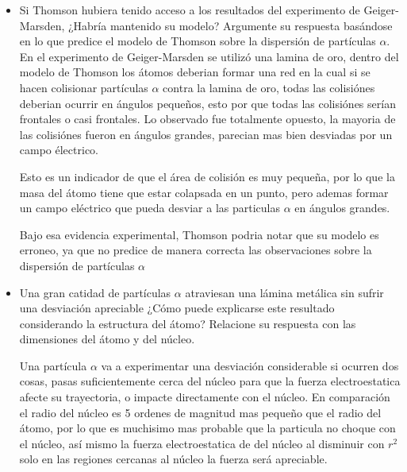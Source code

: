 \documentclass[12pt,a4paper]{article}
\begin{document}
\begin{itemize}
Su deducción fue que las particulas de las cuales estan echos los rayos catodicos son fundamentales en la compocición de la materia, y tienen mucha menos masa que los iones, por lo que tienen que formar parte de los átomos, pero el echo de que los atomos sean neutros y esta nueva particula que los compone tenga carga negativa, implica que el átomo esta formado de una carga positiva que neutralice la carga negativa.\\

\item Si Thomson hubiera tenido acceso a los resultados del experimento de Geiger-Marsden, ¿Habría mantenido su modelo? Argumente su respuesta basándose en lo que predice el modelo de Thomson sobre la dispersión de partículas $\alpha$.\\

En el experimento de Geiger-Marsden se utilizó una lamina de oro, dentro del modelo de Thomson los átomos deberian formar una red en la cual si se hacen colisionar partículas $\alpha$ contra la lamina de oro, todas las colisiónes deberian ocurrir en ángulos pequeños, esto por que todas las colisiónes serían frontales o casi frontales. Lo observado fue totalmente opuesto, la mayoria de las colisiónes fueron en ángulos grandes, parecian mas bien desviadas por un campo électrico.

Esto es un indicador de que el área de colisión es muy pequeña, por lo que la masa del átomo tiene que estar colapsada en un punto, pero ademas formar un campo eléctrico que pueda desviar a las particulas $\alpha$ en ángulos grandes. 


Bajo esa evidencia experimental, Thomson podria notar que su modelo es erroneo, ya que no predice de manera correcta las observaciones sobre la dispersión de partículas $\alpha$\\

\item  Una gran catidad de partículas $\alpha$ atraviesan una lámina metálica sin sufrir una desviación apreciable ¿Cómo puede explicarse este resultado considerando la estructura del átomo? Relacione su respuesta con las dimensiones del átomo y del núcleo. 

Una partícula $\alpha$ va a experimentar una desviación considerable si ocurren dos cosas, pasas suficientemente cerca del núcleo para que la fuerza electroestatica afecte su trayectoria, o impacte directamente con el núcleo. En comparación el radio del núcleo es 5 ordenes de magnitud mas pequeño que el radio del átomo, por lo que es muchisimo mas probable que la particula no choque con el núcleo, así mismo la fuerza electroestatica de del núcleo al disminuir con $r^2$ solo en las regiones cercanas al núcleo la fuerza será apreciable.

\end{itemize}
\end{document}
